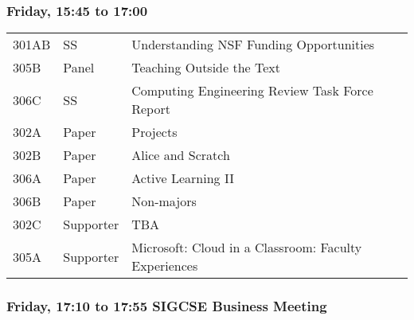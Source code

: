 

\subsubsection*{Friday, 15:45 to 17:00}
\begin{tabular*}{5in}{@{}p{0.5in}@{}p{0.75in}@{}p{3.75in}}

301AB & SS & Understanding NSF Funding Opportunities \\

305B & Panel & Teaching Outside the Text \\

306C & SS & Computing Engineering Review Task Force Report \\

302A & Paper & Projects \\

302B & Paper & Alice and Scratch \\

306A & Paper & Active Learning II \\

306B & Paper & Non-majors \\

302C & Supporter & TBA \\

305A & Supporter & Microsoft:  Cloud in a Classroom:  Faculty Experiences 
\end{tabular*}
\subsubsection*{Friday, 17:10 to 17:55 SIGCSE Business Meeting}

